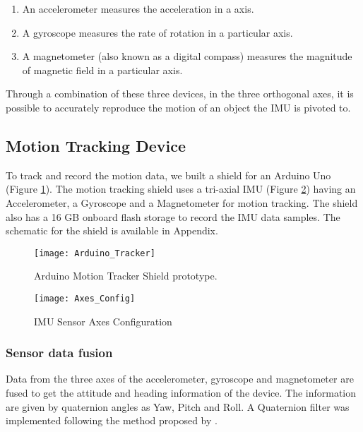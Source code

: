 \documentclass[
10pt,           %
a4paper,        %
oneside,        %
headinclude,footinclude, %
]{scrartcl}
\begin{document}
\begin{enumerate}
	\item An accelerometer measures the acceleration in a axis.
	\item A gyroscope measures the rate of rotation in a particular axis.
	\item A magnetometer (also known as a digital compass) measures the magnitude of magnetic field in a particular axis.
\end{enumerate}

Through a combination of these three devices, in the three orthogonal axes, it is possible to accurately reproduce the motion of an object the \gls{IMU} is pivoted to.

\subsection{Motion Tracking Device}
To track and record the motion data, we built a shield for an Arduino Uno (Figure \ref{tracker_shield}). The motion tracking shield uses a tri-axial \gls{IMU} (Figure \ref{Axes_Config}) having an Accelerometer, a Gyroscope and a Magnetometer for motion tracking. The shield also has a 16 GB onboard flash storage to record the IMU data samples. The schematic for the shield is available in Appendix.

\begin{figure}[h]
  \begin{center}
    \texttt{[image: Arduino\_Tracker]}
  \end{center}
  \vspace{-10pt}
  \caption{\label{tracker_shield}Arduino Motion Tracker Shield prototype.}
  \vspace{-10pt}
\end{figure}

\begin{figure}[h]
  \begin{center}
    \texttt{[image: Axes\_Config]}
  \end{center}
  \vspace{-10pt}
  \caption{\label{Axes_Config}IMU Sensor Axes Configuration}
  \vspace{-10pt}
\end{figure}

\subsubsection{Sensor data fusion}
Data from the three axes of the accelerometer, gyroscope and magnetometer are fused to get the attitude and heading information of the device. The information are given by quaternion angles as Yaw, Pitch and Roll. A Quaternion filter was implemented following the method proposed by \cite{Madgwick2011}.
\end{document}
